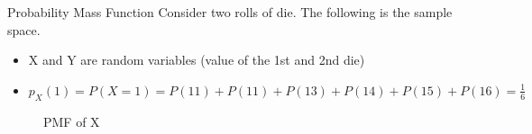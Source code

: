 \documentclass[handout]{beamer}
\begin{document}
\begin{frame}{Probability Mass Function}
   Consider two rolls of die. The following is the sample space.

   \begin{table}[h]
    \centering
    \end{table}
    \begin{itemize}
        \item X and Y are random variables (value of the 1st and 2nd die)
        \item $p_X(1) = P(X = 1) = P(11) + P(11) + P(13) + P(14) + P(15) + P(16) = \frac{1}{6}$
    \end{itemize}


    \begin{figure}
            
    
                \caption{PMF of X}
                \label{fig:my_label}
            \end{figure}

    
    
        





    
\end{frame}
\end{document}
